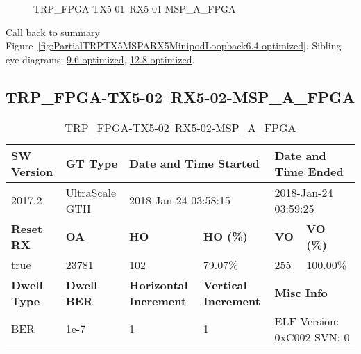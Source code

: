 \begin{figure}[h]
\caption{TRP\_FPGA-TX5-01--RX5-01-MSP\_A\_FPGA} \label{fig:TRPFPGATX501RX501MSPAFPGA6.4-optimized}
\end{figure}

Call back to summary Figure~\ref{fig:PartialTRPTX5MSPARX5MinipodLoopback6.4-optimized}.
Sibling eye diagrams: \hyperref[sec:TRPFPGATX501RX501MSPAFPGA9.6-optimized]{9.6-optimized}, \hyperref[sec:TRPFPGATX501RX501MSPAFPGA12.8-optimized]{12.8-optimized}.

\clearpage
\newpage


\subsection{TRP\_FPGA-TX5-02--RX5-02-MSP\_A\_FPGA}\label{sec:TRPFPGATX502RX502MSPAFPGA6.4-optimized}

\begin{table}[h]
\centering
\caption{TRP\_FPGA-TX5-02--RX5-02-MSP\_A\_FPGA}
\label{tab:TRPFPGATX502RX502MSPAFPGA6.4-optimized}
\begin{tabular}{@{}|l|l|l|l|l|l|@{}}
\toprule
\textbf{SW Version}                & \textbf{GT Type}   & \multicolumn{2}{l|}{\textbf{Date and Time Started}}            & \multicolumn{2}{l|}{\textbf{Date and Time Ended}}        \\ \midrule
2017.2                       & UltraScale GTH          & \multicolumn{2}{l|}{2018-Jan-24 03:58:15}                   & \multicolumn{2}{l|}{2018-Jan-24 03:59:25}               \\ \midrule
\textbf{Reset RX}                  & \textbf{OA} & \textbf{HO}   & \textbf{HO (\%)} & \textbf{VO} & \textbf{VO (\%)} \\ \midrule
true & 23781        & 102          & 79.07\%        & 255        & 100.00\%       \\ \midrule
\textbf{Dwell Type}                & \textbf{Dwell BER} & \textbf{Horizontal Increment} & \textbf{Vertical Increment}    & \multicolumn{2}{l|}{\textbf{Misc Info}}                  \\ \midrule
BER                            & 1e-7        & 1        & 1           & \multicolumn{2}{l|}{ELF Version: 0xC002 SVN: 0}                         \\ \bottomrule
\end{tabular}
\end{table}

